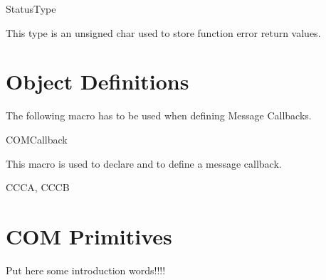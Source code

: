 \begin{type}{StatusType}
  \begin{typedescription}
    This type is an unsigned char used to store function error return values.
  \end{typedescription}
\end{type}


\pagebreak


\section{Object Definitions}
The following macro has to be used when defining Message Callbacks.

\begin{function_nopb}{COMCallback}
  \begin{fundescription}
    This macro is used to declare and to define a message callback.
  \end{fundescription}
  \begin{funparameters}
  \end{funparameters}
  \begin{funconformance}
    CCCA, CCCB
  \end{funconformance}
\end{function_nopb}






\pagebreak


\section{COM Primitives}

Put here some introduction words!!!!
\pagebreak


